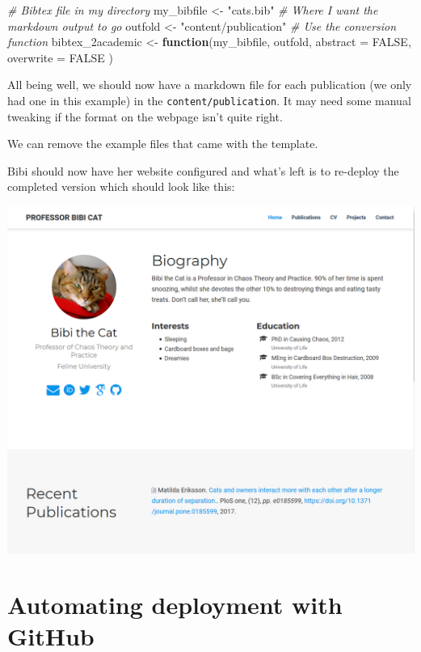\documentclass[12pt,]{book}
\newenvironment{Shaded}{\begin{snugshade}}{\end{snugshade}}
\newcommand{\DataTypeTok}[1]{\textcolor[rgb]{0.13,0.29,0.53}{#1}}
\newcommand{\StringTok}[1]{\textcolor[rgb]{0.31,0.60,0.02}{#1}}
\newcommand{\CommentTok}[1]{\textcolor[rgb]{0.56,0.35,0.01}{\textit{#1}}}
\newcommand{\OtherTok}[1]{\textcolor[rgb]{0.56,0.35,0.01}{#1}}
\newcommand{\ControlFlowTok}[1]{\textcolor[rgb]{0.13,0.29,0.53}{\textbf{#1}}}
\newcommand{\NormalTok}[1]{#1}
\theoremstyle{definition}
\theoremstyle{definition}
\theoremstyle{definition}
\theoremstyle{remark}
\begin{document}
\begin{Shaded}
\begin{Highlighting}[]
\CommentTok{# Bibtex file in my directory}
\NormalTok{my_bibfile <-}\StringTok{ "cats.bib"}
\CommentTok{# Where I want the markdown output to go}
\NormalTok{outfold <-}\StringTok{ "content/publication"}
\CommentTok{# Use the conversion function}
\NormalTok{bibtex_2academic <-}\StringTok{ }\ControlFlowTok{function}\NormalTok{(my_bibfile,}
\NormalTok{                             outfold,}
                             \DataTypeTok{abstract =} \OtherTok{FALSE}\NormalTok{,}
                             \DataTypeTok{overwrite =} \OtherTok{FALSE}
\NormalTok{                             )}
\end{Highlighting}
\end{Shaded}

All being well, we should now have a markdown file for each publication
(we only had one in this example) in the \texttt{content/publication}.
It may need some manual tweaking if the format on the webpage isn't
quite right.

We can remove the example files that came with the template.

Bibi should now have her website configured and what's left is to
re-deploy the completed version which should look like this:

\includegraphics[width=1.2\linewidth]{img/bibi-final-site}

\chapter{Automating deployment with
GitHub}\label{automating-deployment-with-github}
\end{document}
